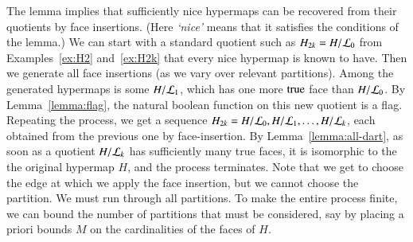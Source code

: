 \begin{remark} The lemma implies that sufficiently nice hypermaps can be recovered
from their quotients by face insertions.  (Here {\it `nice'} means
that it satisfies the conditions of the lemma.)   
We can start with a standard quotient such 
as $H_{2k}=H/{\cal L}_0$
from Examples~\ref{ex:H2} and~\ref{ex:H2k} 
that every nice hypermap is known to have. Then we
generate all face insertions (as we vary over relevant partitions).
Among the generated hypermaps is some $H/{\cal L}_1$, which
has one more ${\operatorname{true}}$ face than $H/{\cal L}_0$.  By 
Lemma~\ref{lemma:flag}, 
the natural boolean function on this new quotient
is a flag.  Repeating the process, we get a sequence
$H_{2k} = H/{\cal L}_0, H/{\cal L}_1,\ldots, H/{\cal L}_k$,
each obtained from the previous one by face-insertion.
By Lemma~\ref{lemma:all-dart}, 
as
soon as a quotient $H/{\cal L}_k$ 
has sufficiently many true faces, it is
isomorphic to the the original hypermap $H$, and the process
terminates.
Note that we get to choose the edge at which we apply the face
insertion, but we cannot choose the partition.  We must run through
all partitions.  To make the entire process finite, we can bound the
number of partitions that must be considered, say by placing a
priori bounds $M$ on the cardinalities of the faces of $H$.
\end{remark}

